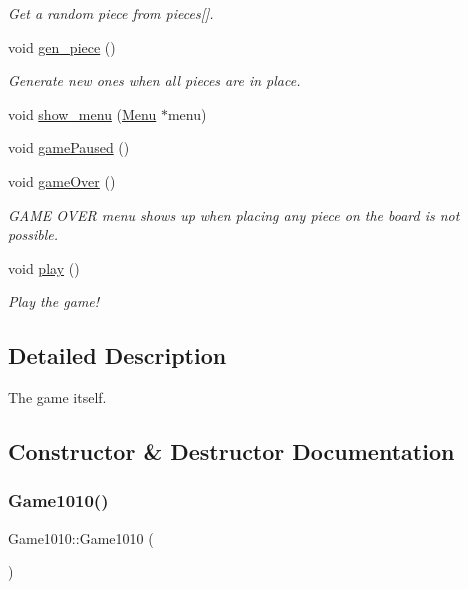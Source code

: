 \begin{DoxyCompactItemize}
\begin{DoxyCompactList}\small\item\em Get a random piece from pieces\mbox{[}\mbox{]}. \end{DoxyCompactList}\item 
void \mbox{\hyperlink{class_game1010_a9576170947a355682c922cb648432b9e}{gen\+\_\+piece}} ()
\begin{DoxyCompactList}\small\item\em Generate new ones when all pieces are in place. \end{DoxyCompactList}\item 
void \mbox{\hyperlink{class_game1010_a99d6f53c3073861fe37ef67caa073840}{show\+\_\+menu}} (\mbox{\hyperlink{class_menu}{Menu}} $\ast$menu)
\item 
void \mbox{\hyperlink{class_game1010_ab9c6def8a07ae00b55bd9b51f407eecd}{game\+Paused}} ()
\item 
void \mbox{\hyperlink{class_game1010_a3bc296b7ba6bffeda3baceb1240190b6}{game\+Over}} ()
\begin{DoxyCompactList}\small\item\em G\+A\+ME O\+V\+ER menu shows up when placing any piece on the board is not possible. \end{DoxyCompactList}\item 
void \mbox{\hyperlink{class_game1010_afa18a3a81b8966417a228459a5bebf53}{play}} ()
\begin{DoxyCompactList}\small\item\em Play the game! \end{DoxyCompactList}\end{DoxyCompactItemize}


\subsection{Detailed Description}
The game itself. 

\subsection{Constructor \& Destructor Documentation}
\mbox{\label{class_game1010_a0a0688219844edbe8f4a44c11a13e32a}} 
\subsubsection{\texorpdfstring{Game1010()}{Game1010()}}
{\footnotesize\ttfamily Game1010\+::\+Game1010 (\begin{DoxyParamCaption}{ }\end{DoxyParamCaption})\hspace{0.3cm}{\ttfamily [inline]}}



